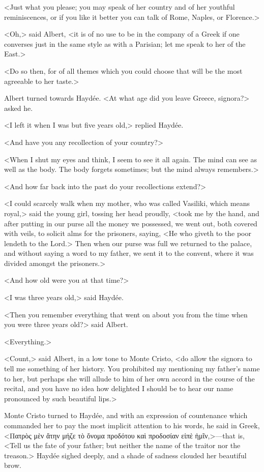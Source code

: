  <Just what you please; you may speak of her country and of her youthful reminiscences, or if you like it better you can talk of Rome, Naples, or Florence.> 

 <Oh,> said Albert, <it is of no use to be in the company of a Greek if one converses just in the same style as with a Parisian; let me speak to her of the East.> 

 <Do so then, for of all themes which you could choose that will be the most agreeable to her taste.> 

 Albert turned towards Haydée. <At what age did you leave Greece, signora?> asked he. 

 <I left it when I was but five years old,> replied Haydée. 

 <And have you any recollection of your country?> 

 <When I shut my eyes and think, I seem to see it all again. The mind can see as well as the body. The body forgets sometimes; but the mind always remembers.> 

 <And how far back into the past do your recollections extend?> 

 <I could scarcely walk when my mother, who was called Vasiliki, which means royal,> said the young girl, tossing her head proudly, <took me by the hand, and after putting in our purse all the money we possessed, we went out, both covered with veils, to solicit alms for the prisoners, saying, <He who giveth to the poor lendeth to the Lord.> Then when our purse was full we returned to the palace, and without saying a word to my father, we sent it to the convent, where it was divided amongst the prisoners.> 

 <And how old were you at that time?> 

 <I was three years old,> said Haydée. 

 <Then you remember everything that went on about you from the time when you were three years old?> said Albert. 

 <Everything.> 

 <Count,> said Albert, in a low tone to Monte Cristo, <do allow the signora to tell me something of her history. You prohibited my mentioning my father's name to her, but perhaps she will allude to him of her own accord in the course of the recital, and you have no idea how delighted I should be to hear our name pronounced by such beautiful lips.> 

 Monte Cristo turned to Haydée, and with an expression of countenance which commanded her to pay the most implicit attention to his words, he said in Greek, <Πατρὸς μὲν ἄτην μήζε τὸ ὄνομα προδότου καὶ προδοσίαν εἰπὲ ἡμῖν,>—that is, <Tell us the fate of your father; but neither the name of the traitor nor the treason.> Haydée sighed deeply, and a shade of sadness clouded her beautiful brow. 

